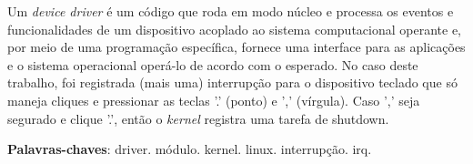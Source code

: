 \documentclass[
	12pt,			
	openright,			%
	twoside,			%
	a4paper,			%
	english,			%
	brazil,				%
	]{abntex2}
\begin{document}

\frenchspacing 

\pretextual

\imprimircapa

\imprimirfolhaderosto*


{
  \begin{folhadeaprovacao}
\begin{center}
{\ABNTEXchapterfont\large\imprimirautor}
\vspace*{\fill}\vspace*{\fill}
\begin{center}
\ABNTEXchapterfont\bfseries\Large\imprimirtitulo
\end{center}
\vspace*{\fill}
\hspace{.45\textwidth}
\begin{minipage}{.5\textwidth}
\imprimirpreambulo
\end{minipage}%
\vspace*{\fill}
\end{center}
\begin{center}
\vspace*{0.5cm}
{\large\imprimirlocal}
\par
{\large\imprimirdata}
\vspace*{1cm}
\end{center}
\end{folhadeaprovacao}
}


\setlength{\absparsep}{18pt} %
\begin{resumo}
  Um \emph{device driver} é um código que roda em modo núcleo e processa
  os eventos e funcionalidades de um dispositivo acoplado ao sistema 
  computacional operante e, por meio de uma programação específica, fornece
  uma interface para as aplicações e o sistema operacional operá-lo de acordo
  com o esperado. No caso deste trabalho, foi registrada (mais uma) interrupção
  para o dispositivo teclado que só maneja cliques e pressionar as teclas '.'
  (ponto) e ',' (vírgula). Caso ',' seja segurado e clique '.', então o
  \emph{kernel} registra uma tarefa de shutdown.

 \noindent
 \textbf{Palavras-chaves}: driver. módulo. kernel. linux. interrupção. irq.
\end{resumo}
\end{document}
